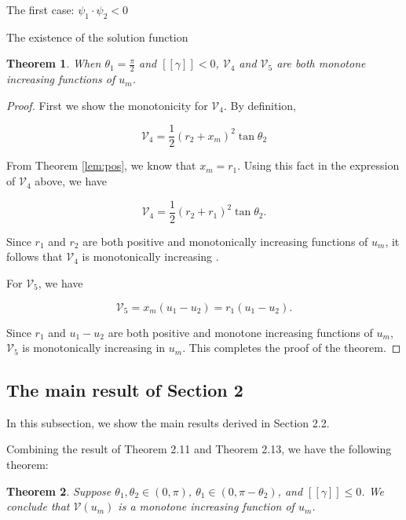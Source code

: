 \documentclass[letterpaper,reqno,10pt,twoside]{amsart}
\newtheorem{theorem}{Theorem}[section]
\theoremstyle{definition}
\theoremstyle{remark}
\begin{document}
\begin{section}{The first case: $\psi_1\cdot \psi_2<0$ }
\begin{subsection}{The existence of the solution function}
  \begin{theorem}
      When $\theta_1=\frac{\pi}{2}$ and $[\![\gamma]\!]<0$,  $\mathscr{V}_4$ and $\mathscr{V}_5$ are both monotone increasing functions of $u_m$.
  \end{theorem}

  \begin{proof}

      First we show the monotonicity for $\mathscr{V}_4$. By definition,

      \begin{equation*}
          \mathscr{V}_4=\frac{1}{2}(r_2+x_m)^{2}\tan\theta_2
      \end{equation*}

      \noindent  From Theorem \ref{lem:pos}, we know that $x_m=r_1$. Using this fact in the expression of $\mathscr{V}_{4}$ above, we have

      \begin{equation*}
          \mathscr{V}_4=\frac{1}{2}(r_2+r_1)^{2}\tan\theta_2.
      \end{equation*}

      \noindent Since $r_1$ and $r_2$ are both positive and monotonically increasing functions of $u_{m}$, it follows that $\mathscr{V}_{4}$ is monotonically increasing .

       For $\mathscr{V}_5$, we have

      \begin{equation*}
          \mathscr{V}_5=x_m(u_1-u_2)=r_1(u_1-u_2).
      \end{equation*}

      \noindent Since $r_1$ and $u_1-u_2$ are both positive and monotone increasing functions of $u_{m}$, $\mathscr{V}_{5}$ is monotonically increasing in $u_{m}$. This completes the proof of the theorem.
      
  \end{proof}

  \subsection{The main result of Section 2} In this subsection, we show the main results derived in Section 2.2.
  
  Combining the result of Theorem 2.11 and Theorem 2.13, we have the following theorem:

  \begin{theorem}
      Suppose $\theta_1,\theta_2\in(0,\pi)$, $\theta_1\in (0,\pi-\theta_2)$, and $[\![\gamma]\!]\leq 0$. We conclude that $\mathscr{V}(u_m)$ is a monotone increasing function of $u_{m}$. 
  \end{theorem}
  

\end{subsection}
\end{section}
\end{document}
